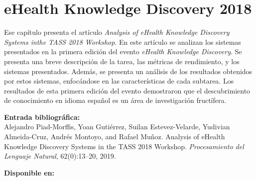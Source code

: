 
\chapter[eHealth Knowledge Discovery 2018: \textit{Analysis of eHealth Knowledge Discovery Systems inthe TASS 2018 Workshop}]{eHealth Knowledge Discovery 2018}
\label{Chap:eHealthKD18}

Ese capítulo presenta el artículo \textit{Analysis of eHealth Knowledge Discovery Systems inthe TASS 2018 Workshop}.
En este artículo se analizan los sistemas presentados en la primera edición del evento \textit{eHealth Knowledge Discovery}.
Se presenta una breve descripción de la tarea, las métricas de rendimiento, y los sistemas presentados.
Además, se presenta un análisis de los resultados obtenidos por estos sistemas, enfocándose en las características de cada subtarea.
Los resultados de esta primera edición del evento demostraron que el descubrimiento de conocimiento en idioma español es un área de investigación fructífera.

\BlankLine
\noindent \textbf{Entrada bibliográfica:}\\
Alejandro Piad-Morffis, Yoan Gutiérrez, Suilan Estevez-Velarde, Yudivian Almeida-Cruz, Andrés Montoyo, and Rafael Muñoz. Analysis of eHealth Knowledge Discovery Systems in the TASS 2018 Workshop. \textit{Procesamiento del Lenguaje Natural}, 62(0):13--20, 2019.

\BlankLine
\noindent \textbf{Disponible en:} \url{}
